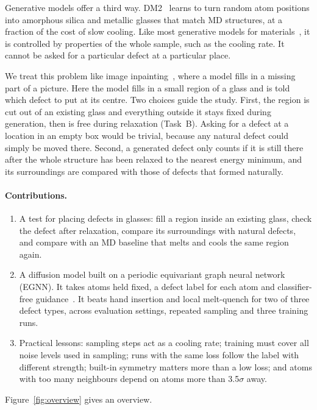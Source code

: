 \documentclass[10pt]{article}
\begin{document}
Generative models offer a third way. DM2~\citep{yang2026dm2} learns to turn random atom positions into amorphous silica and metallic glasses that match MD structures, at a fraction of the cost of slow cooling. Like most generative models for materials~\citep{xie2022cdvae,jiao2023diffcsp,zeni2025mattergen,finkler2026inverse,kwon2024spectroscopy}, it is controlled by properties of the whole sample, such as the cooling rate. It cannot be asked for a particular defect at a particular place.

We treat this problem like image inpainting~\citep{lugmayr2022repaint}, where a model fills in a missing part of a picture. Here the model fills in a small region of a glass and is told which defect to put at its centre. Two choices guide the study. First, the region is cut out of an existing glass and everything outside it stays fixed during generation, then is free during relaxation (Task~B). Asking for a defect at a location in an empty box would be trivial, because any natural defect could simply be moved there. Second, a generated defect only counts if it is still there after the whole structure has been relaxed to the nearest energy minimum, and its surroundings are compared with those of defects that formed naturally.

\paragraph{Contributions.}
\begin{enumerate}
\item A test for placing defects in glasses: fill a region inside an existing glass, check the defect after relaxation, compare its surroundings with natural defects, and compare with an MD baseline that melts and cools the same region again.
\item A diffusion model built on a periodic equivariant graph neural network (EGNN). It takes atoms held fixed, a defect label for each atom and classifier-free guidance~\citep{ho2022cfg}. It beats hand insertion and local melt-quench for two of three defect types, across evaluation settings, repeated sampling and three training runs.
\item Practical lessons: sampling steps act as a cooling rate; training must cover all noise levels used in sampling; runs with the same loss follow the label with different strength; built-in symmetry matters more than a low loss; and atoms with too many neighbours depend on atoms more than 3.5$\sigma$ away.
\end{enumerate}
Figure~\ref{fig:overview} gives an overview.
\end{document}

